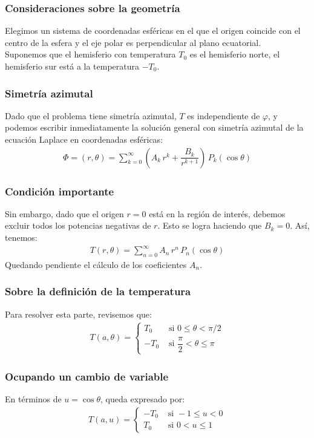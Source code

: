 \documentclass[12pt]{beamer}
\begin{document}
\begin{frame}\label{llama_figura_esferas}
\frametitle{Consideraciones sobre la geometría}
Elegimos un sistema de coordenadas esféricas en el que el origen coincide con el centro de la esfera y el eje polar es perpendicular al plano ecuatorial.
\\
\bigskip
\pause
Suponemos que el hemisferio con temperatura $T_{0}$ es el hemisferio norte, el hemisferio sur está a la temperatura $-T_{0}$.
\hyperlink{figura_esferas}{}
\end{frame}
\begin{frame}
\frametitle{Simetría azimutal}
Dado que el problema tiene simetría azimutal, $T$ es independiente de $\varphi$, y podemos escribir inmediatamente la solución general con simetría azimutal de la ecuación Laplace en coordenadas esféricas:
\pause
\begin{align*}
\Phi = (r, \theta) = \sum_{k=0}^{\infty} \left( A_{k} \, r^{k} + \dfrac{B_{k}}{r^{k+1}} \right) \, P_{k} (\cos \theta)
\end{align*}
\end{frame}
\begin{frame}
\frametitle{Condición importante}
Sin embargo, dado que el origen $r = 0$ está en la región de interés, debemos excluir todos los potencias negativas de $r$. \pause Esto se logra haciendo que $B_{k} = 0$. Así, tenemos:
\pause
\begin{align}
T(r, \theta) = \sum_{n=0}^{\infty} A_{n} \, r^{n} \, P_{n} (\cos \theta)
\label{eq:ecuacion_26_50}
\end{align}
Quedando pendiente el cálculo de los coeficientes $A_{n}$.
\end{frame}
\begin{frame}
\frametitle{Sobre la definición de la temperatura}
Para resolver esta parte, revisemos que:
\begin{align*}
T (a, \theta) = \begin{cases}
T_{0} & \mbox{ si } 0 \leq \theta < \pi / 2 \\[1em]
-T_{0} & \mbox{ si } \dfrac{\pi}{2} < \theta \leq \pi
\end{cases}
\end{align*}
\end{frame}
\begin{frame}
\frametitle{Ocupando un cambio de variable}
En términos de $u = \cos \theta$, queda expresado por:
\begin{align*}
T (a, u) = \begin{cases}
-T_{0} & \mbox{ si } -1 \leq u < 0 \\[1em]
T_{0} & \mbox{ si } 0 < u \leq 1
\end{cases}
\end{align*}
\end{frame}
\end{document}
